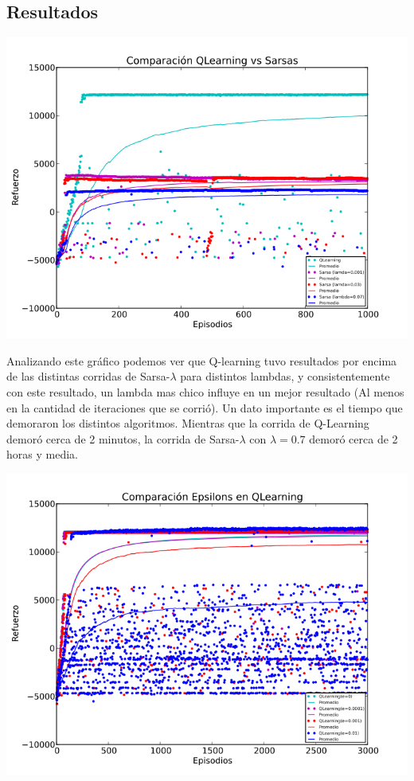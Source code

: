 \documentclass[11pt, a4paper]{article}
\newcommand{\slambda}{Sarsa-$\lambda$ }
\begin{document}
\newpage

\subsection{Resultados}
\includegraphics[scale=0.6]{Graf1}

Analizando este gr\'afico podemos ver que Q-learning tuvo resultados por encima de las distintas corridas de \slambda para distintos lambdas, y consistentemente con este resultado, un lambda mas chico influye en un mejor resultado (Al menos en la cantidad de iteraciones que se corrió). Un dato importante es el tiempo que demoraron los distintos algoritmos. Mientras que la corrida de Q-Learning demoró cerca de 2 minutos, la corrida de \slambda con $\lambda = 0.7$ demoró cerca de 2 horas y media. 

\includegraphics[scale=0.6]{Graf2}
\end{document}
